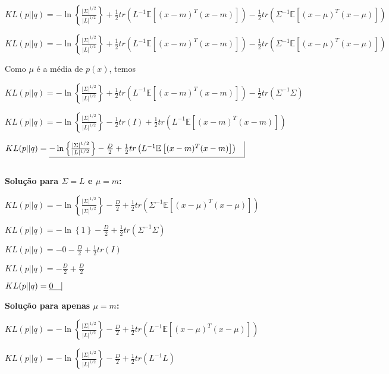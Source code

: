 \begin{enumerate}
    $ KL(p || q) = - \ln \left\{\frac{|\Sigma|^{1/2}}{|L|^{1/2}} \right\} + \frac{1}{2} tr\left(L^{-1}\mathbb{E}\left[  (x - m)^T (x - m) \right]\right) - \frac{1}{2} tr\left(\Sigma^{-1} \mathbb{E} \left[(x - \mu)^T (x - \mu) \right]\right)  $

    $ KL(p || q) = - \ln \left\{\frac{|\Sigma|^{1/2}}{|L|^{1/2}} \right\} + \frac{1}{2} tr\left(L^{-1}\mathbb{E}\left[  (x - m)^T (x - m) \right]\right) - \frac{1}{2} tr\left(\Sigma^{-1} \mathbb{E} \left[(x - \mu)^T (x - \mu) \right]\right)  $

    Como $\mu$ é a média de $p(x)$, temos

    $ KL(p || q) = - \ln \left\{\frac{|\Sigma|^{1/2}}{|L|^{1/2}} \right\} + \frac{1}{2} tr\left(L^{-1}\mathbb{E}\left[  (x - m)^T (x - m) \right]\right) - \frac{1}{2} tr\left(\Sigma^{-1} \Sigma \right) $

    $ KL(p || q) = - \ln \left\{\frac{|\Sigma|^{1/2}}{|L|^{1/2}} \right\} - \frac{1}{2} tr\left(I \right) + \frac{1}{2} tr\left(L^{-1}\mathbb{E}\left[  (x - m)^T (x - m) \right]\right)  $

    $ KL(p || q) = \underline{- \ln \left\{\frac{|\Sigma|^{1/2}}{|L|^{1/2}} \right\} - \frac{D}{2} + \frac{1}{2} tr\left(L^{-1}\mathbb{E}\left[  (x - m)^T (x - m) \right]\right) \quad } \vline  $

    $ $


    \textbf{Solução para $\Sigma = L$ e $\mu = m$:}


    $ KL(p || q) = - \ln \left\{\frac{|\Sigma|^{1/2}}{|\Sigma|^{1/2}} \right\} - \frac{D}{2} + \frac{1}{2} tr\left(\Sigma^{-1}\mathbb{E}\left[  (x - \mu)^T (x - \mu) \right]\right)   $

    $ KL(p || q) = - \ln \left\{1\right\} - \frac{D}{2} + \frac{1}{2} tr\left(\Sigma^{-1}\Sigma\right)   $

    $ KL(p || q) = - 0 - \frac{D}{2} + \frac{1}{2} tr\left(I\right)   $

    $ KL(p || q) = - \frac{D}{2} + \frac{D}{2} $
    
    $ KL(p || q) = \underline{0 \quad} \vline $


    \textbf{Solução para apenas $\mu = m$:}


    $ KL(p || q) = - \ln \left\{\frac{|\Sigma|^{1/2}}{|L|^{1/2}} \right\} - \frac{D}{2} + \frac{1}{2} tr\left(L^{-1}\mathbb{E}\left[  (x - \mu)^T (x - \mu) \right]\right)   $

    $ KL(p || q) = - \ln \left\{\frac{|\Sigma|^{1/2}}{|L|^{1/2}} \right\} - \frac{D}{2} + \frac{1}{2} tr\left(L^{-1}L\right)   $


\end{enumerate}
